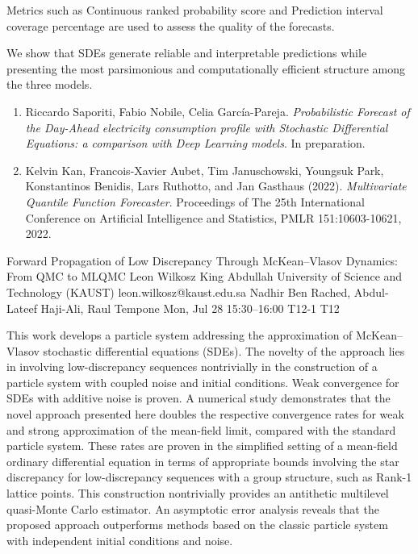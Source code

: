 \begin{talk}
Metrics such as Continuous ranked probability score and Prediction interval coverage percentage are used to assess the quality of the forecasts. 

We show that SDEs generate reliable and interpretable predictions while presenting the most parsimonious and computationally efficient structure among the three models.


\medskip

 

\begin{enumerate}
    \item[{[1]}] Riccardo Saporiti, Fabio Nobile, Celia Garc\'ia-Pareja. {\it Probabilistic Forecast of the Day-Ahead electricity consumption profile with Stochastic Differential Equations: a comparison with Deep Learning models}. In preparation.

 \item[{[2]}] Kelvin Kan, Francois-Xavier Aubet, Tim Januschowski, Youngsuk Park, Konstantinos Benidis, Lars Ruthotto, and Jan Gasthaus (2022). {\it Multivariate Quantile Function Forecaster}. Proceedings of The 25th International Conference on Artificial Intelligence and Statistics, PMLR 151:10603-10621, 2022.
 
\end{enumerate}
 
\end{talk}

\begin{talk}
  {Forward Propagation of Low Discrepancy Through McKean--Vlasov Dynamics: From QMC to MLQMC}%
  {Leon Wilkosz}%
  {King Abdullah University of Science and Technology (KAUST)}%
  {leon.wilkosz@kaust.edu.sa}%
  {Nadhir Ben Rached, Abdul-Lateef Haji-Ali, Raul Tempone}%
  {}%
  {Mon, Jul 28 15:30--16:00}%
  {T12-1}%
  {T12}%
  
    
   
This work develops a particle system addressing the approximation of \linebreak McKean--Vlasov stochastic differential equations (SDEs). The novelty of the approach lies in involving low-discrepancy sequences nontrivially in the construction of a particle system with coupled noise and initial conditions. Weak convergence for SDEs with additive noise is proven. A numerical study demonstrates that the novel approach presented here doubles the respective convergence rates for weak and strong approximation of the mean-field limit, compared with the standard particle system. These rates are proven in the simplified setting of a mean-field ordinary differential equation in terms of appropriate bounds involving the star discrepancy for low-discrepancy sequences with a group structure, such as Rank-1 lattice points. This construction nontrivially provides an antithetic multilevel quasi-Monte Carlo estimator. An asymptotic error analysis reveals that the proposed approach outperforms methods based on the classic particle system with independent initial conditions and noise.
\end{talk}


